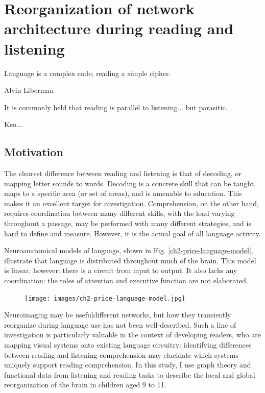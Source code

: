 \chapter{Reorganization of network architecture during reading and listening}

\epigraph{Language is a complex code; reading a simple cipher.}{Alvin Liberman}

\epigraph{It is commonly held that reading is parallel to listening... but parasitic.}{Ken...}

\section{Motivation}

The clearest difference between reading and listening is that of decoding, or mapping letter sounds to words. Decoding is a concrete skill that can be taught, maps to a specific area (or set of areas), and is amenable to education. This makes it an excellent target for investigation. Comprehension, on the other hand, requires coordination between many different skills, with the load varying throughout a passage, may be performed with many different strategies, and is hard to define and measure. However, it is the actual goal of all language activity. 

Neuroanatomical models of language, shown in Fig. \ref{ch2-price-language-model}, illustrate that language is distributed throughout much of the brain. This model is linear, however: there is a circuit from input to output. It also lacks any coordination: the roles of attention and executive function are not elaborated.

\begin{figure}[tp]
	\centering
	\texttt{[image: images/ch2-price-language-model.jpg]}
	\caption[Schematics of skills and brain areas used in reading.]
	\label{fig:ch2-price-language-model}
\end{figure}

Neuroimaging may be usefuldifferent networks, but how they transiently reorganize during language use has not been well-described. Such a line of investigation is particularly valuable in the context of developing readers, who are mapping visual systems onto existing language circuitry: identifying differences between reading and listening comprehension may elucidate which systems uniquely support reading comprehension. In this study, I use graph theory and functional data from listening and reading tasks to describe the local and global reorganization of the brain in children aged 9 to 11.

